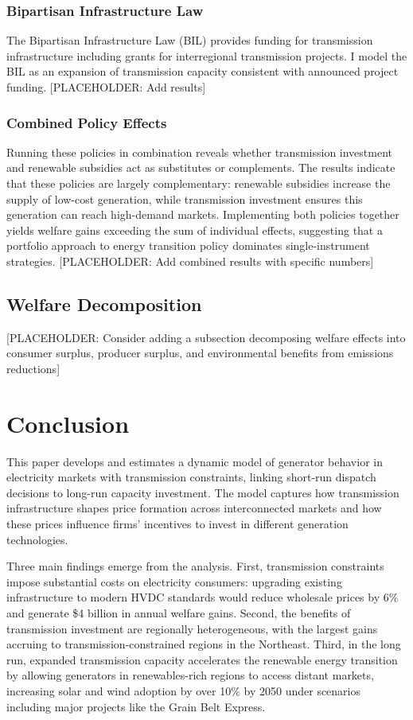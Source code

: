 \documentclass[12pt]{article}
\begin{document}
\subsubsection{Bipartisan Infrastructure Law}

The Bipartisan Infrastructure Law (BIL) provides funding for transmission infrastructure including grants for interregional transmission projects. I model the BIL as an expansion of transmission capacity consistent with announced project funding. [PLACEHOLDER: Add results]

\subsubsection{Combined Policy Effects}

Running these policies in combination reveals whether transmission investment and renewable subsidies act as substitutes or complements. The results indicate that these policies are largely complementary: renewable subsidies increase the supply of low-cost generation, while transmission investment ensures this generation can reach high-demand markets. Implementing both policies together yields welfare gains exceeding the sum of individual effects, suggesting that a portfolio approach to energy transition policy dominates single-instrument strategies. [PLACEHOLDER: Add combined results with specific numbers]

\subsection{Welfare Decomposition}

[PLACEHOLDER: Consider adding a subsection decomposing welfare effects into consumer surplus, producer surplus, and environmental benefits from emissions reductions]

\section{Conclusion} \label{sec:conclusion}

This paper develops and estimates a dynamic model of generator behavior in electricity markets with transmission constraints, linking short-run dispatch decisions to long-run capacity investment. The model captures how transmission infrastructure shapes price formation across interconnected markets and how these prices influence firms' incentives to invest in different generation technologies.

Three main findings emerge from the analysis. First, transmission constraints impose substantial costs on electricity consumers: upgrading existing infrastructure to modern HVDC standards would reduce wholesale prices by 6\% and generate \$4 billion in annual welfare gains. Second, the benefits of transmission investment are regionally heterogeneous, with the largest gains accruing to transmission-constrained regions in the Northeast. Third, in the long run, expanded transmission capacity accelerates the renewable energy transition by allowing generators in renewables-rich regions to access distant markets, increasing solar and wind adoption by over 10\% by 2050 under scenarios including major projects like the Grain Belt Express.
\end{document}
